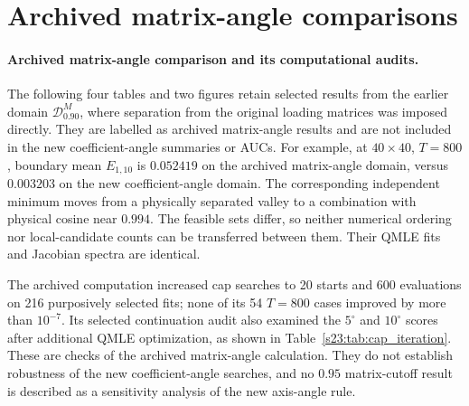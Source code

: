 \documentclass[12pt,letterpaper]{article}
\theoremstyle{plain}
\theoremstyle{definition}
\begin{document}
\clearpage

\FloatBarrier
\clearpage
\section{Archived matrix-angle comparisons}
\clearpage
\paragraph{Archived matrix-angle comparison and its computational audits.}
The following four tables and two figures retain selected results
from the earlier domain $\mathcal D^M_{0.90}$, where separation
from the original loading matrices was imposed directly. They are
labelled as archived matrix-angle results and are not included in
the new coefficient-angle summaries or AUCs.
For example, at $40\times40$, $T=800$, boundary mean $E_{1,10}$
is $0.052419$ on the archived matrix-angle domain, versus
$0.003203$ on the new coefficient-angle domain. The corresponding
independent minimum moves from a physically separated valley to a
combination with physical cosine near $0.994$. The feasible sets
differ, so neither numerical ordering nor local-candidate counts
can be transferred between them. Their QMLE fits and Jacobian
spectra are identical.

The archived computation increased cap searches to 20 starts and
600 evaluations on 216 purposively selected fits; none of its
54 $T=800$ cases improved by more than $10^{-7}$. Its selected
continuation audit also examined the $5^\circ$ and $10^\circ$
scores after additional QMLE optimization, as shown in
Table~\ref{s23:tab:cap_iteration}. These are checks of the archived
matrix-angle calculation. They do not establish robustness of the
new coefficient-angle searches, and no $0.95$ matrix-cutoff result
is described as a sensitivity analysis of the new axis-angle rule.
\end{document}

